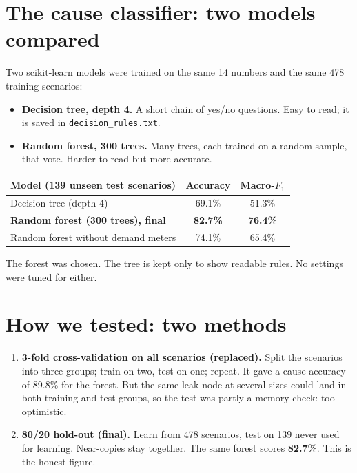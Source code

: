 \documentclass[11pt,a4paper]{article}
\newcommand{\code}[1]{\texttt{#1}}
\begin{document}
\section{The cause classifier: two models compared}
Two scikit-learn models were trained on the same 14 numbers and the same 478 training scenarios:
\begin{itemize}
\item \textbf{Decision tree, depth 4.} A short chain of yes/no questions. Easy to read; it is saved in \code{decision\_rules.txt}.
\item \textbf{Random forest, 300 trees.} Many trees, each trained on a random sample, that vote. Harder to read but more accurate.
\end{itemize}
\begin{center}\small\begin{tabular}{@{}lcc@{}}\toprule
Model (139 unseen test scenarios) & Accuracy & Macro-$F_1$ \\\midrule
Decision tree (depth 4) & 69.1\% & 51.3\% \\
\textbf{Random forest (300 trees), final} & \textbf{82.7\%} & \textbf{76.4\%} \\
Random forest without demand meters & 74.1\% & 65.4\% \\\bottomrule\end{tabular}\end{center}
The forest was chosen. The tree is kept only to show readable rules. No settings were tuned for either.

\section{How we tested: two methods}
\begin{enumerate}
\item \textbf{3-fold cross-validation on all scenarios (replaced).} Split the scenarios into three groups; train on two, test on one; repeat. It gave a cause accuracy of 89.8\% for the forest. But the same leak node at several sizes could land in both training and test groups, so the test was partly a memory check: too optimistic.
\item \textbf{80/20 hold-out (final).} Learn from 478 scenarios, test on 139 never used for learning. Near-copies stay together. The same forest scores \textbf{82.7\%}. This is the honest figure.
\end{enumerate}
\end{document}
